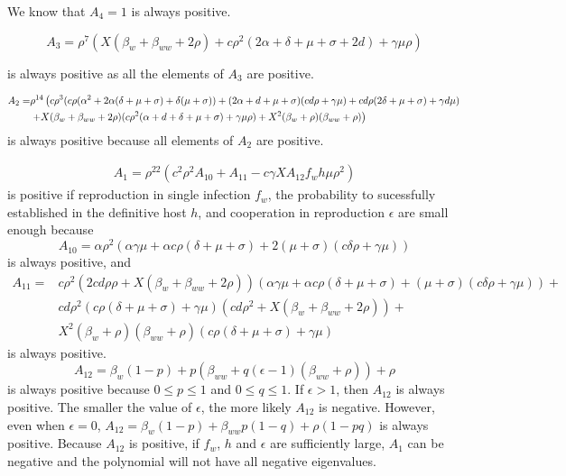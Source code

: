 \documentclass[11pt]{article}
\begin{document}
We know that $A_4 = 1$ is always positive. 

\begin{equation}
	A_3 = \rho ^7 \left(X (\beta_w + \beta_{ww}+2 \rho ) + c \rho^2  (2 \alpha +\delta +\mu +\sigma + 2 d  )+\gamma  \mu  \rho \right)
\end{equation}

is always positive as all the elements of $A_3$ are positive.

\begin{align}
	A_2 = & \rho^{14} \left(c \rho ^3 (c \rho  (\alpha ^2+2 \alpha  (\delta +\mu +\sigma )+\delta  (\mu +\sigma ))+(2 \alpha +d+\mu +\sigma ) (c d \rho +\gamma  \mu )+c d \rho  (2 \delta +\mu +\sigma )+\gamma  d \mu ) \right. \notag \\
	&\left. +X (\beta_w + \beta_{ww}+2 \rho ) (c \rho ^2 (\alpha +d+\delta +\mu +\sigma )+\gamma  \mu  \rho )+X^2 (\beta_w+\rho ) (\beta_{ww}+\rho )\right)
\end{align}
is always positive because all elements of $A_2$ are positive.

\begin{align}
	A_1 =  \rho ^{22} \left(c^2 \rho ^2 A_{10} +A_{11}-c \gamma  X  A_{12} f_w h \mu  \rho ^2 \right)
\end{align}
is positive if reproduction in single infection $f_w$, the probability to sucessfully established in the definitive host $h$, and cooperation in reproduction $\epsilon$ are small enough because 
\begin{equation}
	A_{10} = \alpha  \rho ^2 (\alpha  \gamma  \mu +\alpha  c \rho  (\delta +\mu +\sigma )+2 (\mu +\sigma ) (c \delta  \rho +\gamma  \mu ))
\end{equation}
is always positive, and
\begin{align}
	A_{11} = & c \rho ^2 (2 c d \rho  \rho + X (\beta_w + \beta_{ww}+2 \rho )) (\alpha  \gamma  \mu +\alpha  c \rho  (\delta +\mu +\sigma ) +  (\mu +\sigma ) (c \delta  \rho +\gamma  \mu )) + \\
	& c d \rho ^2 (c \rho  (\delta +\mu +\sigma )+\gamma  \mu ) (c d \rho ^2+X (\beta_w+\beta_{ww}+2 \rho )) + \\
	& X^2 (\beta_w+\rho ) (\beta_{ww}+\rho ) (c \rho  (\delta +\mu +\sigma )+\gamma  \mu )
\end{align}
is always positive.
\begin{equation}
	A_{12} =\beta_w (1-p)+p (\beta_{ww}+q (\epsilon -1) (\beta_{ww}+\rho ))+\rho
\end{equation}
is always positive because $0 \leq p \leq 1$ and $0 \leq q \leq 1$. If $\epsilon > 1$, then $A_{12}$ is always positive. The smaller the value of $\epsilon$, the more likely $A_{12}$ is negative. However, even when $\epsilon = 0$, $A_{12} = \beta_w (1-p) + \beta_{ww} p (1-q)+\rho  (1-p q)$ is always positive.
Because $A_{12}$ is positive, if $f_w$, $h$ and $\epsilon$ are sufficiently large, $A_1$ can be negative and the polynomial will not have all negative eigenvalues.
\end{document}
